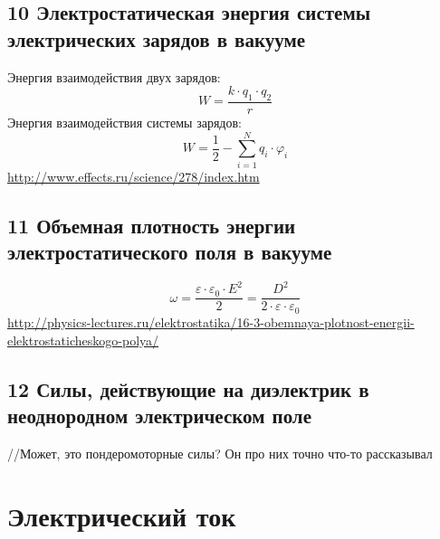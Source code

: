 \documentclass[a4paper,12pt]{article}
\begin{document}
\subsection{10   Электростатическая энергия системы электрических зарядов в вакууме}
Энергия взаимодействия двух зарядов:\\
\begin{equation}
	W = \frac{k \cdot q_1 \cdot q_2}{r}
\end{equation}
Энергия взаимодействия системы зарядов:\\
\begin{equation}
	W = \frac{1}{2} - \sum _{i = 1} ^N q_i \cdot \varphi _i
\end{equation}
\url{http://www.effects.ru/science/278/index.htm}

\subsection{11	Объемная плотность энергии электростатического поля в вакууме}
\begin{equation}
	\omega = \frac{\varepsilon \cdot \varepsilon _0 \cdot E^2}{2} = \frac{D^2}{2 \cdot \varepsilon \cdot \varepsilon _0}
\end{equation}
\url{http://physics-lectures.ru/elektrostatika/16-3-obemnaya-plotnost-energii-elektrostaticheskogo-polya/}

\subsection{12   Силы, действующие на диэлектрик в неоднородном электрическом поле}
//Может, это пондеромоторные силы? Он про них точно что-то рассказывал

\section{Электрический ток}
\end{document}
